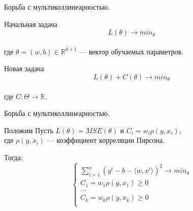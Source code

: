\documentclass{beamer}
\begin{document}
\begin{frame}{Борьба с мультиколлинеарностью.}
\begin{block}{Начальная задача}
$$L(\theta) \rightarrow min_{\theta}$$ \\
где $\theta = (w, b) \in \mathbb{R}^{d+1}$ — вектор обучаемых параметров. 
\end{block}
\begin{block}{Новая задача}
$$L(\theta) + C(\theta) \rightarrow min_{\theta}$$ 
\\ где $C: \Theta \rightarrow \mathbb{R}$. 
\end{block}
\end{frame}
\begin{frame}{Борьба с мультиколлинеарностью.}
\begin{block}{Положим}
    Пусть $L(\theta) = MSE(\theta)$ и $C_i = w_i \rho(y, x_i)$, \\
    где $\rho(y, x_i)$ — коэффициент корреляции Пирсона. \\
\end{block}
\begin{block}{Тогда:} \\
\begin{equation}
\begin{cases}
    \sum_{i=1}^n (y^i - b - \langle w, x^i\rangle)^2 \rightarrow min_\theta\\
    C_1 = w_1 \rho(y, x_1) \geq 0\\
    \dots \\
    C_k = w_k \rho(y, x_k) \geq 0 \\
\end{cases}
\end{equation}
\end{block}
\end{frame}
\end{document}
